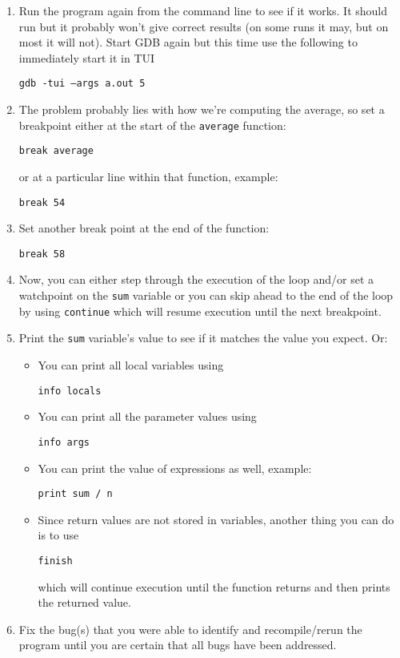 \documentclass[12pt]{scrartcl}
\begin{document}
\begin{enumerate}
  \item Run the program again from the command line to see if it works.
  It should run but it probably won't give correct results (on some runs it
  may, but on most it will not).  Start GDB again
  but this time use the following to immediately start it in TUI
  
  \texttt{gdb -tui --args a.out 5}
  
  \item The problem probably lies with how we're computing the average, so 
  set a breakpoint either at the start of the \texttt{average} function:
  
  \texttt{break average}
  
  or at a particular line within that function, example:
  
  \texttt{break 54}
  
  \item Set another break point at the end of the function:

  \texttt{break 58}
  
  \item Now, you can either step through the execution of the loop 
  and/or set a watchpoint on the \texttt{sum} variable or you 
  can skip ahead to the end of the loop by using \texttt{continue}
  which will resume execution until the next breakpoint.
  
  \item Print the \texttt{sum} variable's value to see if it 
  matches the value you expect.  Or:
  
  \begin{itemize}
    \item You can print all local variables using
    
    \texttt{info locals}
  
     \item You can print all the parameter values using
     
     \texttt{info args}

	 \item You can print the value of expressions as well, example:
	 
	 \texttt{print sum / n}
	 
	 \item Since return values are not stored in variables, another thing
	 you can do is to use 

	 \texttt{finish}
	 
	 which will continue execution until the function returns and then
	 prints the returned value.
  \end{itemize}

  \item Fix the bug(s) that you were able to identify and recompile/rerun the
  program until you are certain that all bugs have been addressed.
  
\end{enumerate}
\end{document}
